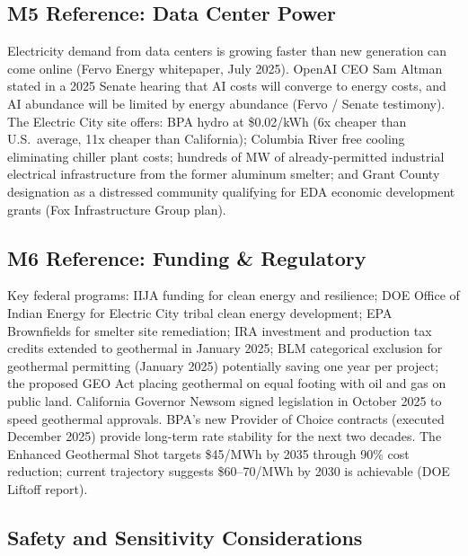 \documentclass[11pt,letterpaper]{article}
\begin{document}
\subsection{M5 Reference: Data Center Power}

Electricity demand from data centers is growing faster than new generation can come online (Fervo Energy whitepaper, July 2025). OpenAI CEO Sam Altman stated in a 2025 Senate hearing that AI costs will converge to energy costs, and AI abundance will be limited by energy abundance (Fervo / Senate testimony). The Electric City site offers: BPA hydro at \$0.02/kWh (6x cheaper than U.S.\ average, 11x cheaper than California); Columbia River free cooling eliminating chiller plant costs; hundreds of MW of already-permitted industrial electrical infrastructure from the former aluminum smelter; and Grant County designation as a distressed community qualifying for EDA economic development grants (Fox Infrastructure Group plan).

\subsection{M6 Reference: Funding \& Regulatory}

Key federal programs: IIJA funding for clean energy and resilience; DOE Office of Indian Energy for Electric City tribal clean energy development; EPA Brownfields for smelter site remediation; IRA investment and production tax credits extended to geothermal in January 2025; BLM categorical exclusion for geothermal permitting (January 2025) potentially saving one year per project; the proposed GEO Act placing geothermal on equal footing with oil and gas on public land. California Governor Newsom signed legislation in October 2025 to speed geothermal approvals. BPA's new Provider of Choice contracts (executed December 2025) provide long-term rate stability for the next two decades. The Enhanced Geothermal Shot targets \$45/MWh by 2035 through 90\% cost reduction; current trajectory suggests \$60--70/MWh by 2030 is achievable (DOE Liftoff report).

\subsection{Safety and Sensitivity Considerations}
\end{document}
